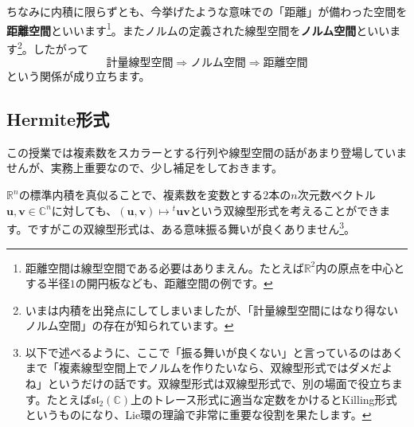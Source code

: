 ちなみに内積に限らずとも、今挙げたような意味での「距離」が備わった空間を\textbf{距離空間}といいます\footnote{距離空間は線型空間である必要はありまえん。たとえば$\mathbb{R}^2$内の原点を中心とする半径$1$の開円板なども、距離空間の例です。}。またノルムの定義された線型空間を\textbf{ノルム空間}といいます\footnote{いまは内積を出発点にしてしまいましたが、「計量線型空間にはなり得ないノルム空間」の存在が知られています。}。したがって
\[
\text{計量線型空間} \Longrightarrow
\text{ノルム空間} \Longrightarrow
\text{距離空間}
\]
という関係が成り立ちます。

\subsection{Hermite形式}

この授業では複素数をスカラーとする行列や線型空間の話があまり登場していませんが、実務上重要なので、少し補足をしておきます。

$\mathbb{R}^n$の標準内積を真似ることで、複素数を変数とする$2$本の$n$次元数ベクトル$\bm{u}, \bm{v} \in \mathbb{C}^n$に対しても、$(\bm{u}, \bm{v})\mapsto {}^t\bm{u} \bm{v}$という双線型形式を考えることができます。ですがこの双線型形式は、ある意味振る舞いが良くありません\footnote{以下で述べるように、ここで「振る舞いが良くない」と言っているのはあくまで「複素線型空間上でノルムを作りたいなら、双線型形式ではダメだよね」というだけの話です。双線型形式は双線型形式で、別の場面で役立ちます。たとえば$\mathfrak{sl}_2(\mathbb{C})$上のトレース形式に適当な定数をかけるとKilling形式というものになり、Lie環の理論で非常に重要な役割を果たします。}。

